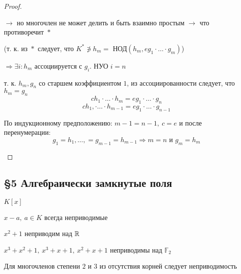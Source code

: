 \begin{proof}
\begin{enumerate}
            \par \quad $\rightarrow$ но многочлен не может делить и быть взаимно простым $\rightarrow$ что противоречит $\boxed{*}$ %
            \par \quad (т. к. из $\boxed{*}$ следует, что $K^* \not \ni h_m = $ НОД$(h_m, eg_1 \cdot \ldots \cdot g_m)$)
            \par \quad $\Rightarrow \exists i : h_m$ ассоциируется с $g_i$. НУО $i = n$
            \par \quad т. к. $h_m, g_n$ со старшем коэффициентом $1$, из ассоциированности следует, что $h_m = g_n$
            \[
                ch_1 \cdot \ldots \cdot h_m = eg_1 \cdot \ldots \cdot g_n    
            \]
            \[
                ch_1, \cdot \ldots \cdot h_{m-1} = eg_1 \cdot \ldots \cdot g_{n-1}
            \]
            \par \quad По индукционному предположению: $m-1 = n-1, \ c = e$ и после перенумерации:
            \[
                g_1 = h_1, \dots, = g_{m-1} = h_{m-1} \Rightarrow m = n \text{ и } g_m = h_m    
            \]
        \end{enumerate}
    \end{proof}

    \subsection*{\S5 Алгебраически замкнутые поля}

    \par $K[x]$
    \par $x - a, \ a \in K$ всегда неприводимые

    \begin{illustration*}
        $x^2 + 1$ неприводим над $\mathbb{R}$
        \par \quad $x^3 + x^2 + 1, \ x^3 + x + 1, \ x^2 + x + 1$ неприводимы над $\mathbb{F}_2$
    \end{illustration*}

    \par Для многочленов степени $2$ и $3$ из отсутствия корней следует неприводимость

